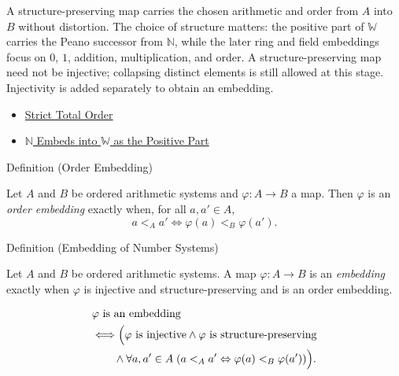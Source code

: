 \begin{remark*}[Interpretation]
A structure-preserving map carries the chosen arithmetic and order from $A$
into $B$ without distortion. The choice of structure matters: the positive
part of $\mathbb{W}$ carries the Peano successor from $\mathbb{N}$, while
the later ring and field embeddings focus on $0$, $1$, addition,
multiplication, and order. A structure-preserving map need not be injective;
collapsing distinct elements is still allowed at this stage. Injectivity is
added separately to obtain an embedding.
\end{remark*}
\begin{dependencies}
\begin{itemize}
  \item \hyperref[def:strict-total-order]{Strict Total Order}
  \item \hyperref[thm:n-embeds-into-w-as-positive-part]{$\mathbb{N}$ Embeds into $\mathbb{W}$ as the Positive Part}
\end{itemize}
\end{dependencies}
\begin{definitionbox}{Definition (Order Embedding)}
\begin{definition*}
Let $A$ and $B$ be ordered arithmetic systems and $\varphi:A\to B$ a map. Then $\varphi$ is an \emph{order embedding} exactly when, for all $a,a'\in A$,
\[
a<_A a' \Longleftrightarrow \varphi(a)<_B\varphi(a').
\]
\end{definition*}
\end{definitionbox}
\begin{definitionbox}{Definition (Embedding of Number Systems)}
\begin{definition}
\label{def:number-system-embedding}
Let $A$ and $B$ be ordered arithmetic systems. A map $\varphi:A\to B$ is an \emph{embedding} exactly when $\varphi$ is injective and structure-preserving and is an order embedding.
\end{definition}
\end{definitionbox}
\begin{remark*}
\[
\begin{aligned}
&\varphi \text{ is an embedding}\\
&\Longleftrightarrow \Bigl(\varphi \text{ is injective}\land \varphi \text{ is structure-preserving}\\
&\qquad\land \forall a,a'\in A\;(a<_A a'\Leftrightarrow\varphi(a)<_B\varphi(a'))\Bigr).
\end{aligned}
\]
\end{remark*}
